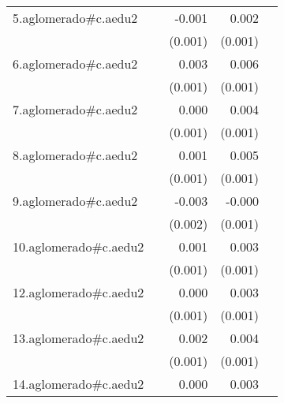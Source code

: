 {\begin{longtable}{l*{4}{D{.}{.}{-1}}}
\addlinespace
5.aglomerado#c.aedu2&                     &      -0.001         &       0.002\sym{*}  &                     \\
            &                     &     (0.001)         &     (0.001)         &                     \\
\addlinespace
6.aglomerado#c.aedu2&                     &       0.003\sym{*}  &       0.006\sym{***}&                     \\
            &                     &     (0.001)         &     (0.001)         &                     \\
\addlinespace
7.aglomerado#c.aedu2&                     &       0.000         &       0.004\sym{***}&                     \\
            &                     &     (0.001)         &     (0.001)         &                     \\
\addlinespace
8.aglomerado#c.aedu2&                     &       0.001         &       0.005\sym{***}&                     \\
            &                     &     (0.001)         &     (0.001)         &                     \\
\addlinespace
9.aglomerado#c.aedu2&                     &      -0.003         &      -0.000         &                     \\
            &                     &     (0.002)         &     (0.001)         &                     \\
\addlinespace
10.aglomerado#c.aedu2&                     &       0.001         &       0.003\sym{***}&                     \\
            &                     &     (0.001)         &     (0.001)         &                     \\
\addlinespace
12.aglomerado#c.aedu2&                     &       0.000         &       0.003\sym{**} &                     \\
            &                     &     (0.001)         &     (0.001)         &                     \\
\addlinespace
13.aglomerado#c.aedu2&                     &       0.002         &       0.004\sym{***}&                     \\
            &                     &     (0.001)         &     (0.001)         &                     \\
\addlinespace
14.aglomerado#c.aedu2&                     &       0.000         &       0.003\sym{**} &                     \\

\end{longtable}}
